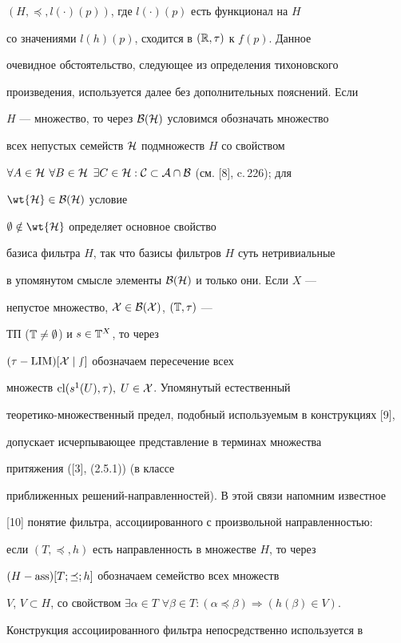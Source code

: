 $(H,\preceq,l(\cdot)(p))$, где $l(\cdot)(p)$ есть функционал на $H$


со значениями $l(h)(p)$, сходится в $(\Bbb R,\tau)$ к $f(p)$. Данное


очевидное обстоятельство, следующее из определения тихоновского


произведения, используется далее без дополнительных пояснений. Если


$H$ --- множество, то через $\cal B(H)$ условимся обозначать множество


всех непустых семейств $\cal H$ подмножеств $H$ со свойством


$\forall A\in\cal H$ $\forall B\in\cal H$ $\exists C\in


\cal H:C\subset A \cap B$ (см. [8], c.\,226); для


$\wt{\cal H}\in\cal B(H)$ условие


$\emptyset\notin\wt{\cal H}$ определяет основное свойство


базиса фильтра $H$, так что базисы фильтров $H$ суть нетривиальные


в упомянутом смысле элементы $\cal B(H)$ и только они. Если $X$ ---


непустое множество, $\cal X\in\cal B(X)$, $(\Bbb T,\tau)$ ---


ТП ($\Bbb T\ne\emptyset$) и $s\in\Bbb T^X$, то через


$(\tau-\operatorname{LIM})[\cal X\mid s]$ обозначаем пересечение всех


множеств $\operatorname{cl}(s^1(U),\tau),\;U\in\cal X$. Упомянутый естественный


теоретико-множественный предел, подобный используемым в конструкциях [9],


допускает исчерпывающее представление в терминах множества


притяжения ([3], (2.5.1)) (в классе


приближенных решений-направленностей). В этой связи напомним известное


[10] понятие фильтра, ассоциированного с произвольной направленностью:


если $(T,\preceq,h)$ есть направленность в множестве $H$, то через


$(H-\operatorname{ass})[T;\preceq;h]$ обозначаем семейство всех множеств


$V$, $V\subset H$, со свойством $\exists\alpha\in T$ $\forall\beta\in


T:(\alpha\preceq\beta)\Longrightarrow(h(\beta)\in V)$.


Конструкция ассоциированного фильтра непосредственно используется в


